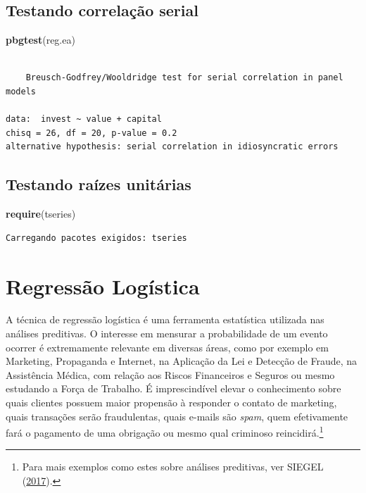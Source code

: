 \documentclass[12pt,brazil,oneside]{book}
\newenvironment{Shaded}{\begin{snugshade}}{\end{snugshade}}
\newcommand{\KeywordTok}[1]{\textcolor[rgb]{0.13,0.29,0.53}{\textbf{#1}}}
\newcommand{\NormalTok}[1]{#1}
\let\rmarkdownfootnote\footnote%
\def\footnote{\protect\rmarkdownfootnote}
\begin{document}
\hypertarget{testando-correlacao-serial}{%
\section{Testando correlação serial}\label{testando-correlacao-serial}}

\begin{Shaded}
\begin{Highlighting}[]
\KeywordTok{pbgtest}\NormalTok{(reg.ea)}
\end{Highlighting}
\end{Shaded}

\begin{verbatim}

    Breusch-Godfrey/Wooldridge test for serial correlation in panel models

data:  invest ~ value + capital
chisq = 26, df = 20, p-value = 0.2
alternative hypothesis: serial correlation in idiosyncratic errors
\end{verbatim}

\hypertarget{testando-raizes-unitarias}{%
\section{Testando raízes unitárias}\label{testando-raizes-unitarias}}

\begin{Shaded}
\begin{Highlighting}[]
\KeywordTok{require}\NormalTok{(tseries)}
\end{Highlighting}
\end{Shaded}

\begin{verbatim}
Carregando pacotes exigidos: tseries
\end{verbatim}

\hypertarget{regressao-logistica}{%
\chapter{Regressão Logística}\label{regressao-logistica}}

A técnica de regressão logística é uma ferramenta estatística utilizada
nas análises preditivas. O interesse em mensurar a probabilidade de um
evento ocorrer é extremamente relevante em diversas áreas, como por
exemplo em Marketing, Propaganda e Internet, na Aplicação da Lei e
Detecção de Fraude, na Assistência Médica, com relação aos Riscos
Financeiros e Seguros ou mesmo estudando a Força de Trabalho. É
imprescindível elevar o conhecimento sobre quais clientes possuem maior
propensão à responder o contato de marketing, quais transações serão
fraudulentas, quais e-mails são \emph{spam}, quem efetivamente fará o
pagamento de uma obrigação ou mesmo qual criminoso reincidirá.\footnote{Para
  mais exemplos como estes sobre análises preditivas, ver SIEGEL
  (\protect\hyperlink{ref-Siegel2017}{2017}).}
\end{document}
